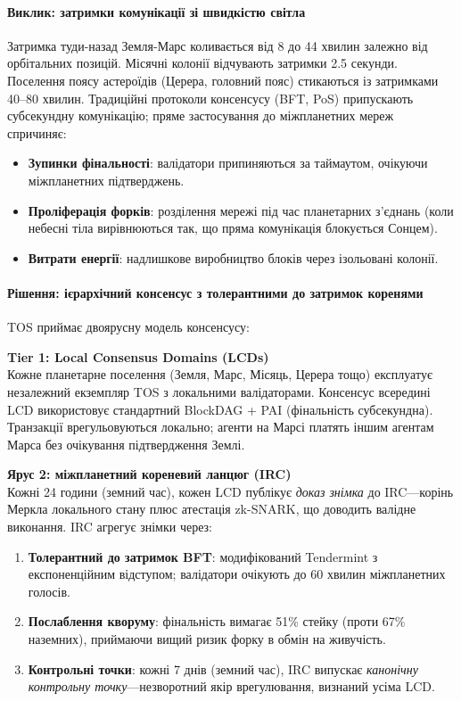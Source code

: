 \documentclass[11pt]{article}
\begin{document}
\paragraph{Виклик: затримки комунікації зі швидкістю світла}
Затримка туди-назад Земля-Марс коливається від 8 до 44 хвилин залежно від орбітальних позицій. Місячні колонії відчувають затримки 2.5 секунди. Поселення поясу астероїдів (Церера, головний пояс) стикаються із затримками 40--80 хвилин. Традиційні протоколи консенсусу (BFT, PoS) припускають субсекундну комунікацію; пряме застосування до міжпланетних мереж спричиняє:
\begin{itemize}[noitemsep]
  \item \textbf{Зупинки фінальності}: валідатори припиняються за таймаутом, очікуючи міжпланетних підтверджень.
  \item \textbf{Проліферація форків}: розділення мережі під час планетарних з'єднань (коли небесні тіла вирівнюються так, що пряма комунікація блокується Сонцем).
  \item \textbf{Витрати енергії}: надлишкове виробництво блоків через ізольовані колонії.
\end{itemize}

\paragraph{Рішення: ієрархічний консенсус з толерантними до затримок коренями}
TOS приймає двоярусну модель консенсусу:

\textbf{Tier 1: Local Consensus Domains (LCDs)}\\
Кожне планетарне поселення (Земля, Марс, Місяць, Церера тощо) експлуатує незалежний екземпляр TOS з локальними валідаторами. Консенсус всередині LCD використовує стандартний BlockDAG + PAI (фінальність субсекундна). Транзакції врегульовуються локально; агенти на Марсі платять іншим агентам Марса без очікування підтвердження Землі.

\textbf{Ярус 2: міжпланетний кореневий ланцюг (IRC)}\\
Кожні 24 години (земний час), кожен LCD публікує \emph{доказ знімка} до IRC—корінь Меркла локального стану плюс атестація zk-SNARK, що доводить валідне виконання. IRC агрегує знімки через:
\begin{enumerate}[noitemsep]
  \item \textbf{Толерантний до затримок BFT}: модифікований Tendermint з експоненційним відступом; валідатори очікують до 60 хвилин міжпланетних голосів.
  \item \textbf{Послаблення кворуму}: фінальність вимагає 51\% стейку (проти 67\% наземних), приймаючи вищий ризик форку в обмін на живучість.
  \item \textbf{Контрольні точки}: кожні 7 днів (земний час), IRC випускає \emph{канонічну контрольну точку}—незворотний якір врегулювання, визнаний усіма LCD.
\end{enumerate}
\end{document}
